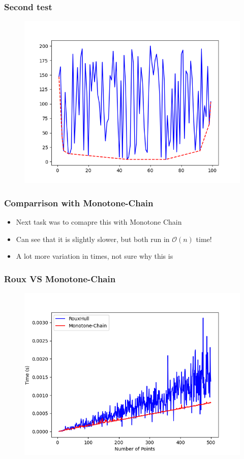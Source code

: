 \documentclass{beamer}
\begin{document}
\begin{frame}
\frametitle{Second test}
	\begin{figure}
		\center
		\includegraphics[scale=0.6]{../Figures/Figure_11.png}
	\end{figure}
\end{frame}

\begin{frame}
\frametitle{Comparrison with Monotone-Chain}
\begin{itemize}
	\item Next task was to comapre this with Monotone Chain
	\pause
	\item Can see that it is slightly slower, but both run in $\mathcal{O}(n)$ time!
	\pause
	\item A lot more variation in times, not sure why this is
\end{itemize}
\end{frame}

\begin{frame}
\frametitle{Roux VS Monotone-Chain}
	\begin{figure}
		\center
		\includegraphics[scale=0.6]{../Figures/rouxVSmono.png}
	\end{figure}
\end{frame}
\end{document}

